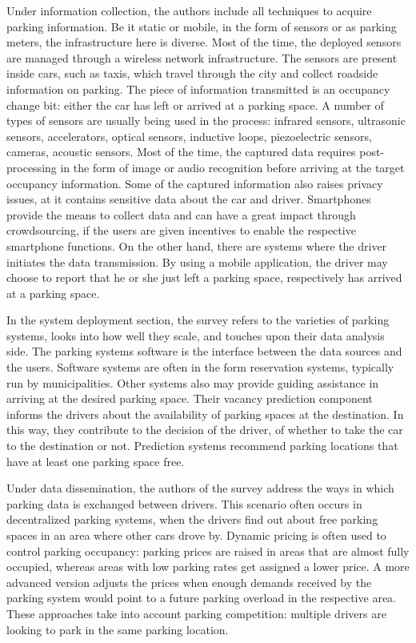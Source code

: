 Under information collection, the authors include all techniques to acquire parking information. Be it static or mobile, in the form of sensors or as parking meters, the infrastructure here is diverse. Most of the time, the deployed sensors are managed through a wireless network infrastructure. The sensors are present inside cars, such as taxis, which travel through the city and collect  roadside information on parking. The piece of information transmitted is an occupancy change bit: either the car has left or arrived at a parking space. A number of types of sensors are usually being used in the process: infrared sensors, ultrasonic sensors, accelerators, optical sensors, inductive loops, piezoelectric sensors, cameras, acoustic sensors. Most of the time, the captured data requires post-processing in the form of image or audio recognition before arriving at the target occupancy information. Some of the captured information also raises privacy issues, at it contains sensitive data about the car and driver. Smartphones provide the means to collect data and can have a great impact through crowdsourcing, if the users are given incentives to enable the respective smartphone functions. On the other hand, there are systems where the driver initiates the data transmission. By using a mobile application, the driver may choose to report that he or she just left a parking space, respectively has arrived at a parking space. 

In the system deployment section, the survey refers to the varieties of parking systems, looks into how well they scale, and touches upon their data analysis side. The parking systems software is the interface between the data sources and the users. Software systems are often in the form reservation systems, typically run by municipalities. Other systems also may provide guiding assistance in arriving at the desired parking space. Their vacancy prediction component informs the drivers about the availability of parking spaces at the destination. In this way, they contribute to the decision of the driver, of whether to take the car to the destination or not. Prediction systems recommend parking locations that have at least one parking space free.

Under data dissemination, the authors of the survey address the ways in which parking data is exchanged between drivers. This scenario often occurs in decentralized parking systems, when the drivers find out about free parking spaces in an area where other cars drove by. Dynamic pricing is often used to control parking occupancy: parking prices are raised in areas that are almost fully occupied, whereas areas with low parking rates get assigned a lower price. A more advanced version adjusts the prices when enough demands received by the parking system would point to a future parking overload in the respective area. These approaches take into account parking competition: multiple drivers are looking to park in the same parking location.

